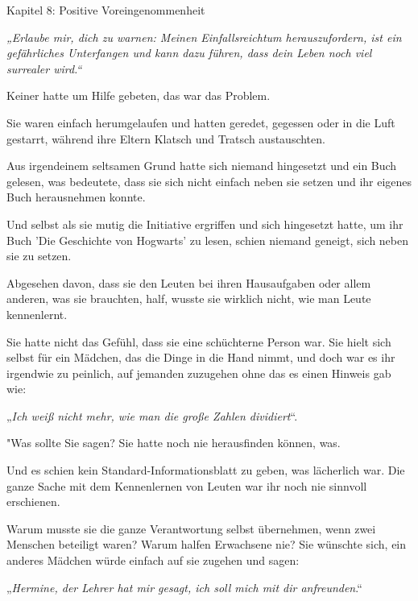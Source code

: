 

\hypertarget{positive-voreingenommenheit}{%

Kapitel 8: Positive Voreingenommenheit

\emph{\hfill\break „Erlaube mir, dich zu warnen: Meinen Einfallsreichtum herauszufordern, ist ein gefährliches Unterfangen und kann dazu führen, dass dein Leben noch viel surrealer wird.“}

Keiner hatte um Hilfe gebeten, das war das Problem.

Sie waren einfach herumgelaufen und hatten geredet, gegessen oder in die Luft gestarrt, während ihre Eltern Klatsch und Tratsch austauschten.

Aus irgendeinem seltsamen Grund hatte sich niemand hingesetzt und ein Buch gelesen, was bedeutete, dass sie sich nicht einfach neben sie setzen und ihr eigenes Buch herausnehmen konnte.

Und selbst als sie mutig die Initiative ergriffen und sich hingesetzt hatte, um ihr Buch 'Die Geschichte von Hogwarts' zu lesen, schien niemand geneigt, sich neben sie zu setzen.

Abgesehen davon, dass sie den Leuten bei ihren Hausaufgaben oder allem anderen, was sie brauchten, half, wusste sie wirklich nicht, wie man Leute kennenlernt.

Sie hatte nicht das Gefühl, dass sie eine schüchterne Person war. Sie hielt sich selbst für ein Mädchen, das die Dinge in die Hand nimmt, und doch war es ihr irgendwie zu peinlich, auf jemanden zuzugehen ohne das es einen Hinweis gab wie:

„\emph{Ich weiß nicht mehr, wie man die große Zahlen dividiert}“.

"Was sollte Sie sagen? Sie hatte noch nie herausfinden können, was.

Und es schien kein Standard-Informationsblatt zu geben, was lächerlich war. Die ganze Sache mit dem Kennenlernen von Leuten war ihr noch nie sinnvoll erschienen.

Warum musste sie die ganze Verantwortung selbst übernehmen, wenn zwei Menschen beteiligt waren? Warum halfen Erwachsene nie? Sie wünschte sich, ein anderes Mädchen würde einfach auf sie zugehen und sagen:

„\emph{Hermine, der Lehrer hat mir gesagt, ich soll mich mit dir anfreunden}.“

}
